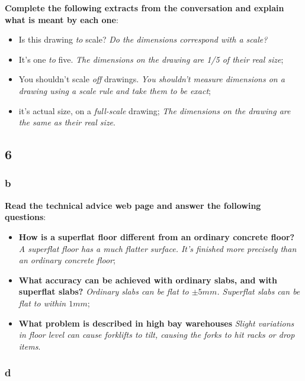 \textbf{Complete the following extracts from the conversation and explain what is meant by each one}:

\begin{itemize}

\item Is this drawing \textit{to} scale? \textit{Do the dimensions correspond with a scale?}
\item It's one \textit{to} five. \textit{The dimensions on the drawing are 1/5 of their real size};
\item You shouldn't scale \textit{off} drawings. \textit{You shouldn't measure dimensions on a drawing using a scale rule and take them to be exact};
\item it's actual size, on a \textit{full-scale} drawing; \textit{ The dimensions on the drawing are the same as their real size}.

\end{itemize}

\subsection{6}

\subsubsection{b}

\textbf{Read the technical advice web page and answer the following questions}:

\begin{itemize}

\item{\textbf{How is a superflat floor different from an ordinary concrete floor?}} \textit{A superflat floor has a much flatter surface. It's finished more precisely than an ordinary concrete floor};
\item{\textbf{What accuracy can be achieved with ordinary slabs, and with superflat slabs?}} \textit{Ordinary slabs can be flat to $\pm 5mm$. Superflat slabs can be flat to within $1mm$};
\item{\textbf{What problem is described in high bay warehouses}} \textit{Slight variations in floor level can cause forklifts to tilt, causing the forks to hit racks or drop items}.

\end{itemize}

\subsubsection{d}

